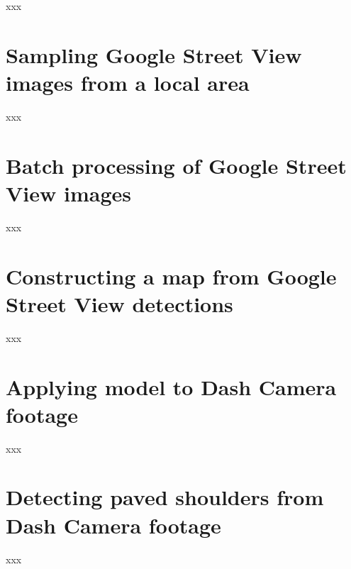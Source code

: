 \documentclass[11pt,twoside]{report}
\begin{document}
xxx

\chapter{Sampling Google Street View images from a local area}
\label{a:sample_area1}

xxx

\chapter{Batch processing of Google Street View images}
\label{a:gsv_batch}

xxx

\chapter{Constructing a map from Google Street View detections}
\label{a:gsv_map}

xxx

\chapter{Applying model to Dash Camera footage}
\label{a:apply_dashcam}

xxx

\chapter{Detecting paved shoulders from Dash Camera footage}
\label{a:lane_detection}

xxx

\cleardoublepage


\end{document}
